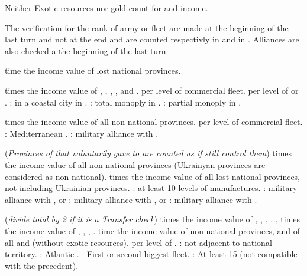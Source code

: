 \aparag Neither Exotic resources nor gold count for \COL and \TP income.

\aparag The verification for the rank of army or fleet are made at the
beginning of the last turn and not at the end and are counted respectivly in
\LD and in \NWD.
\aparag Alliances are also checked a the beginning of the last turn

 time the income value of lost national provinces.

 times the income value of ,
, , ,
and .
 \VP per level of commercial fleet.
 \VP per level of \COL or \TP.
 \VPs: \COL in a coastal city in .%
 \VPs: total monoply in .
 \VPs: partial monoply in .

 times the income value of all non national provinces.
 \VP per level of commercial fleet.
 \VPs: Mediterranean .
 \VPs: military alliance with .

\bparag ({\it Provinces of  that 
  voluntarily gave to  are counted as if
   still control them})
 times the income value of all non-national provinces (Ukrainyan
provinces are considered as non-national).
 times the income value of all lost national provinces, not
including Ukrainian provinces.
 \VPs: at least 10 levels of manufactures.
 \VPs: military alliance with , or
 \VPs: military alliance with , or
 \VPs: military alliance with .

\bparag ({\it divide total by 2 if it is a Transfer check})
 times the income value of ,
, , ,
, 
 times the income value of ,
, , .
 time the income value of non-national provinces, and of all \COL and
\TP (without exotic resources).
 \VP per level of .
 \VPs: \FRA not adjacent to national territory.
 \VPs: Atlantic .
 \VPs: First or second biggest fleet.
 \VPs: At least 15 \NWD (not compatible with the precedent).


